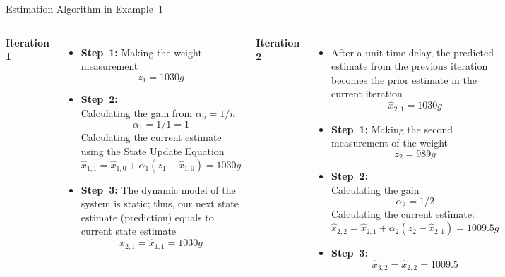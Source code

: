 \begin{frame}{Estimation Algorithm in Example~1}
\begin{columns}
    \textbf{Iteration 1}
    \begin{itemize}
        \item \textbf{Step~1:} Making the weight measurement
        $$z_1 = 1030 g$$
        \item \textbf{Step~2:}\\
        Calculating the gain from $\alpha_n = 1/n$
        $$\alpha_1 = 1/1 = 1$$
        Calculating the current estimate using the State Update Equation
        $$\hat{x}_{1,1} = \hat{x}_{1,0} + \alpha_1 \left(z_1 - \hat{x}_{1,0}\right) = 1030g$$
        \item \textbf{Step~3:} The dynamic model of the system is static; thus, our next state estimate (prediction) equals to current state estimate
        $$\hat{x}_{2,1}=\hat{x}_{1,1} = 1030g$$
     \end{itemize}
\textbf{Iteration 2}
\begin{itemize}
    \item After a unit time delay, the predicted estimate from the previous iteration becomes the prior estimate in the current iteration
    $$\hat{x}_{2,1}= 1030g$$
    \item \textbf{Step~1:} Making the second measurement of the weight
    $$z_2= 989g$$
    \item \textbf{Step~2:} \\
    Calculating the gain
    $$\alpha_2= 1/2$$
    Calculating the current estimate:
    $$\hat{x}_{2,2} = \hat{x}_{2,1} + \alpha_2 \left(z_2 - \hat{x}_{2,1}\right) = 1009.5g$$
    \item \textbf{Step~3:} 
    $$\hat{x}_{3,2} = \hat{x}_{2,2} = 1009.5$$
\end{itemize}
\end{columns}
\end{frame}
